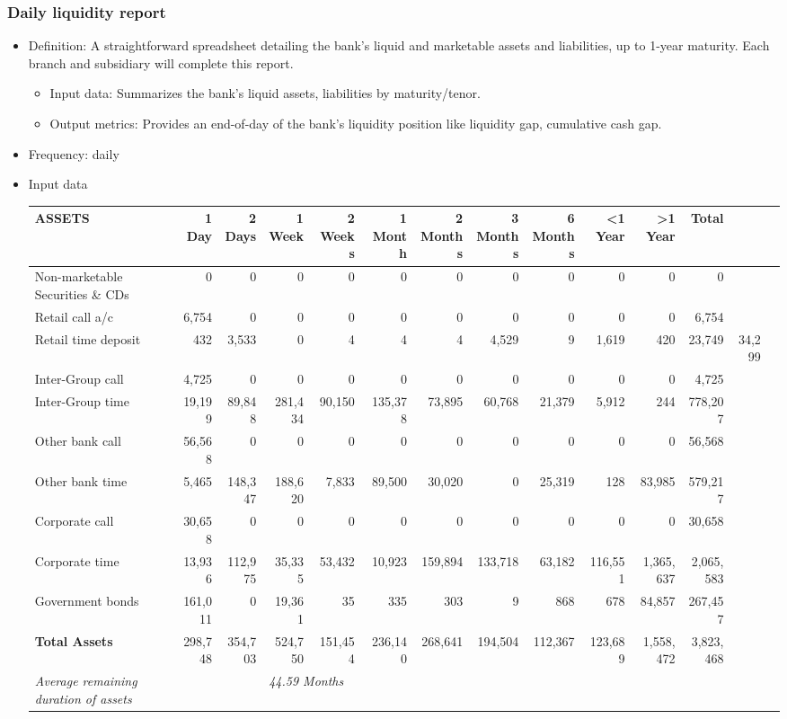 \subsubsection{Daily liquidity report}
\begin{itemize}
\item Definition: A straightforward spreadsheet detailing the bank's liquid and marketable assets and liabilities, up to 1-year maturity. Each branch and subsidiary will complete this report.
    \begin{itemize}
    \item Input data: Summarizes the bank's liquid assets, liabilities by maturity/tenor.
    
  
    \item Output metrics: Provides an end-of-day of the bank's liquidity position like liquidity gap, cumulative cash gap.
    \end{itemize}
    
\item Frequency: daily
\item Input data


\begin{scriptsize}
    \begin{tabular}{@{}lrrrrrrrrrrrrr@{}}
    \toprule
    \textbf{ASSETS} & 1 Day & 2 Days & 1 Week & 2 Weeks & 1 Month & 2 Months & 3 Months & 6 Months & <1 Year & >1 Year & \textbf{Total} \\ \midrule
    Non-marketable Securities \& CDs & 0 & 0 & 0 & 0 & 0 & 0 & 0 & 0 & 0 & 0 & 0 \\
    Retail call a/c & 6,754 & 0 & 0 & 0 & 0 & 0 & 0 & 0 & 0 & 0 & 6,754 \\
    Retail time deposit & 432 & 3,533 & 0 & 4 & 4 & 4 & 4,529 & 9 & 1,619 & 420 & 23,749 & 34,299 \\
    Inter-Group call & 4,725 & 0 & 0 & 0 & 0 & 0 & 0 & 0 & 0 & 0 & 4,725 \\
    Inter-Group time & 19,199 & 89,848 & 281,434 & 90,150 & 135,378 & 73,895 & 60,768 & 21,379 & 5,912 & 244 & 778,207 \\
    Other bank call & 56,568 & 0 & 0 & 0 & 0 & 0 & 0 & 0 & 0 & 0 & 56,568 \\
    Other bank time & 5,465 & 148,347 & 188,620 & 7,833 & 89,500 & 30,020 & 0 & 25,319 & 128 & 83,985 & 579,217 \\
    Corporate call & 30,658 & 0 & 0 & 0 & 0 & 0 & 0 & 0 & 0 & 0 & 30,658 \\
    Corporate time & 13,936 & 112,975 & 35,335 & 53,432 & 10,923 & 159,894 & 133,718 & 63,182 & 116,551 & 1,365,637 & 2,065,583 \\
    Government bonds & 161,011 & 0 & 19,361 & 35 & 335 & 303 & 9 & 868 & 678 & 84,857 & 267,457 \\ \midrule
    \textbf{Total Assets} & 298,748 & 354,703 & 524,750 & 151,454 & 236,140 & 268,641 & 194,504 & 112,367 & 123,689 & 1,558,472 & 3,823,468 \\ \midrule
    \textit{Average remaining duration of assets} & & & \multicolumn{9}{l}{\textit{44.59 Months}} \\ 
    \bottomrule
    \end{tabular}
    \end{scriptsize}



\end{itemize}
